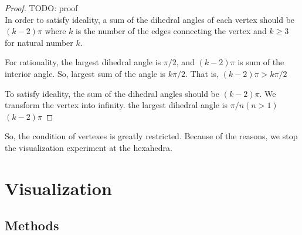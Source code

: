 \documentclass[suppldata, dvipdfmx]{interact}
\theoremstyle{plain}%
\theoremstyle{definition}
\theoremstyle{remark}
\theoremstyle{problemstyle}
\begin{document}
\begin{proof}
 TODO: proof\\
 In order to satisfy ideality, a sum of the dihedral angles of each vertex
 should be $(k - 2) \pi$ where $k$ is the number of the edges connecting
 the vertex and $k \geq 3$ for natural number $k$.

 For rationality, 
 the largest dihedral angle is $\pi / 2$, and 
 $(k-2)\pi$ is sum of the interior angle.
 So, largest sum of the angle is $k\pi / 2$.
 That is,  $(k -  2)\pi > k\pi / 2$

 To satisfy ideality, the sum of the dihedral angles should be $(k - 2)
 \pi$. 
 We transform the vertex into infinity.
 the largest dihedral angle is $\pi / n (n > 1)$
 $(k - 2)\pi$
\end{proof}

So, the condition of vertexes is greatly restricted.
Because of the reasons, we stop the visualization experiment at the hexahedra.

\section{Visualization}

\subsection{Methods}
\end{document}
